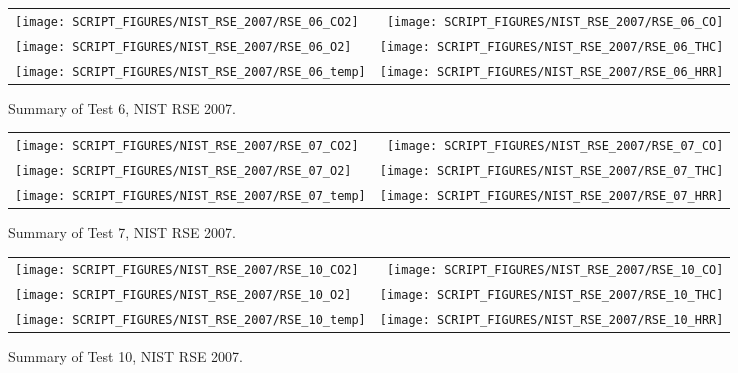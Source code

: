 \begin{figure}[p]
\begin{tabular*}{\textwidth}{l@{\extracolsep{\fill}}r}
\texttt{[image: SCRIPT\_FIGURES/NIST\_RSE\_2007/RSE\_06\_CO2]} &
\texttt{[image: SCRIPT\_FIGURES/NIST\_RSE\_2007/RSE\_06\_CO]} \\
\texttt{[image: SCRIPT\_FIGURES/NIST\_RSE\_2007/RSE\_06\_O2]} &
\texttt{[image: SCRIPT\_FIGURES/NIST\_RSE\_2007/RSE\_06\_THC]} \\
\texttt{[image: SCRIPT\_FIGURES/NIST\_RSE\_2007/RSE\_06\_temp]} &
\texttt{[image: SCRIPT\_FIGURES/NIST\_RSE\_2007/RSE\_06\_HRR]}
\end{tabular*}
\caption[Summary of Test 6, NIST RSE 2007]{Summary of Test 6, NIST RSE 2007.}
\label{NIST_RSE_2007_6}
\end{figure}

\begin{figure}[p]
\begin{tabular*}{\textwidth}{l@{\extracolsep{\fill}}r}
\texttt{[image: SCRIPT\_FIGURES/NIST\_RSE\_2007/RSE\_07\_CO2]} &
\texttt{[image: SCRIPT\_FIGURES/NIST\_RSE\_2007/RSE\_07\_CO]} \\
\texttt{[image: SCRIPT\_FIGURES/NIST\_RSE\_2007/RSE\_07\_O2]} &
\texttt{[image: SCRIPT\_FIGURES/NIST\_RSE\_2007/RSE\_07\_THC]} \\
\texttt{[image: SCRIPT\_FIGURES/NIST\_RSE\_2007/RSE\_07\_temp]} &
\texttt{[image: SCRIPT\_FIGURES/NIST\_RSE\_2007/RSE\_07\_HRR]}
\end{tabular*}
\caption[Summary of Test 7, NIST RSE 2007]{Summary of Test 7, NIST RSE 2007.}
\label{NIST_RSE_2007_7}
\end{figure}

\begin{figure}[p]
\begin{tabular*}{\textwidth}{l@{\extracolsep{\fill}}r}
\texttt{[image: SCRIPT\_FIGURES/NIST\_RSE\_2007/RSE\_10\_CO2]} &
\texttt{[image: SCRIPT\_FIGURES/NIST\_RSE\_2007/RSE\_10\_CO]} \\
\texttt{[image: SCRIPT\_FIGURES/NIST\_RSE\_2007/RSE\_10\_O2]} &
\texttt{[image: SCRIPT\_FIGURES/NIST\_RSE\_2007/RSE\_10\_THC]} \\
\texttt{[image: SCRIPT\_FIGURES/NIST\_RSE\_2007/RSE\_10\_temp]} &
\texttt{[image: SCRIPT\_FIGURES/NIST\_RSE\_2007/RSE\_10\_HRR]}
\end{tabular*}
\caption[Summary of Test 10, NIST RSE 2007]{Summary of Test 10, NIST RSE 2007.}
\label{NIST_RSE_2007_10}
\end{figure}

